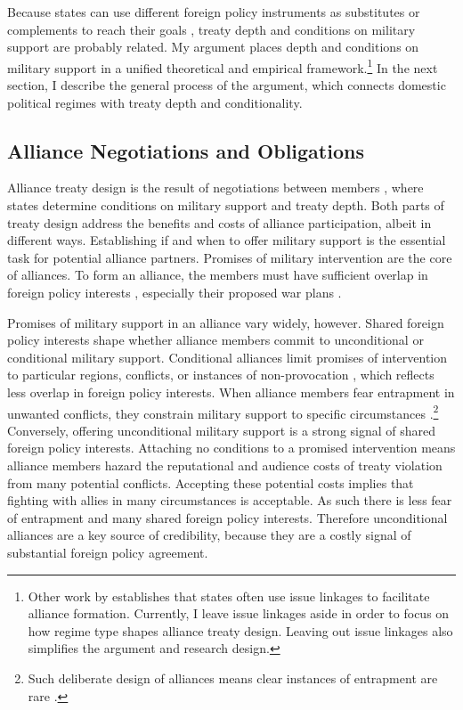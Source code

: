 \documentclass[12pt]{article}
\begin{document}
Because states can use different foreign policy instruments as substitutes or complements to reach their goals \citep{Starr2000, MorganPalmer2000}, treaty depth and conditions on military support are probably related. 
My argument places depth and conditions on military support in a unified theoretical and empirical framework.\footnote{Other work by \citet{Poast2012, Poast2013} establishes that states often use issue linkages to facilitate alliance formation. Currently, I leave issue linkages aside in order to focus on how regime type shapes alliance treaty design. Leaving out issue linkages also simplifies the argument and research design.}
In the next section, I describe the general process of the argument, which connects domestic political regimes with treaty depth and conditionality. 


\subsection{Alliance Negotiations and Obligations}


Alliance treaty design is the result of negotiations between members \citep{Poast2019a}, where states determine conditions on military support and treaty depth.
Both parts of treaty design address the benefits and costs of alliance participation, albeit in different ways.
Establishing if and when to offer military support is the essential task for potential alliance partners. 
Promises of military intervention are the core of alliances. 
To form an alliance, the members must have sufficient overlap in foreign policy interests \citep{Morrow1991, Smith1995, FordhamPoast2014}, especially their proposed war plans \citep{Poast2019a}.  


Promises of military support in an alliance vary widely, however. 
Shared foreign policy interests shape whether alliance members commit to unconditional or conditional military support.
Conditional alliances limit promises of intervention to particular regions, conflicts, or instances of non-provocation \citep{Leedsetal2000}, which reflects less overlap in foreign policy interests. 
When alliance members fear entrapment in unwanted conflicts, they constrain military support to specific circumstances \citep{Kim2011, Benson2012}.\footnote{Such deliberate design of alliances means clear instances of entrapment are rare \citep{Kim2011, Beckley2015}.} 
Conversely, offering unconditional military support is a strong signal of shared foreign policy interests. 
Attaching no conditions to a promised intervention means alliance members hazard the reputational \citep{Gibler2008, Crescenzietal2012} and audience \citep{Fearon1997} costs of treaty violation from many potential conflicts. 
Accepting these potential costs implies that fighting with allies in many circumstances is acceptable.
As such there is less fear of entrapment and many shared foreign policy interests. 
Therefore unconditional alliances are a key source of credibility, because they are a costly signal of substantial foreign policy agreement. 
\end{document}
